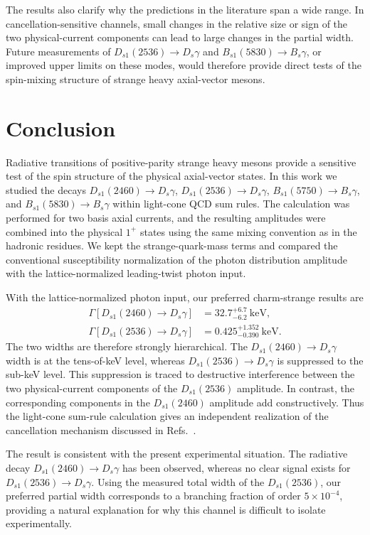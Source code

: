 \documentclass[aps,prd,preprint,nofootinbib,superscriptaddress]{revtex4-2}
\newcommand{\Ds}{D_s}
\newcommand{\Dsone}{D_{s1}}
\newcommand{\Bs}{B_s}
\newcommand{\Bsone}{B_{s1}}
\newcommand{\keV}{\mathrm{keV}}
\begin{document}
The results also clarify why the predictions in the literature span a wide
range.  In cancellation-sensitive channels, small changes in the relative size
or sign of the two physical-current components can lead to large changes in
the partial width.  Future measurements of
$\Dsone(2536)\to\Ds\gamma$ and $\Bsone(5830)\to\Bs\gamma$, or improved upper
limits on these modes, would therefore provide direct tests of the spin-mixing
structure of strange heavy axial-vector mesons.


\section{Conclusion}
\label{sec:concl}

Radiative transitions of positive-parity strange heavy mesons provide a
sensitive test of the spin structure of the physical axial-vector states.  In
this work we studied the decays
$\Dsone(2460)\to\Ds\gamma$, $\Dsone(2536)\to\Ds\gamma$,
$\Bsone(5750)\to\Bs\gamma$, and $\Bsone(5830)\to\Bs\gamma$
within light-cone QCD sum rules.  The calculation was performed for two basis
axial currents, and the resulting amplitudes were combined into the physical
$1^+$ states using the same mixing convention as in the hadronic residues.  We
kept the strange-quark-mass terms and compared the conventional
susceptibility normalization of the photon distribution amplitude with the
lattice-normalized leading-twist photon input.

With the lattice-normalized photon input, our preferred charm-strange results
are
\begin{align}
  \Gamma[\Dsone(2460)\to\Ds\gamma]
  &=
  32.7^{+6.7}_{-6.2}~\keV,
  \\
  \Gamma[\Dsone(2536)\to\Ds\gamma]
  &=
  0.425^{+1.352}_{-0.390}~\keV .
\end{align}
The two widths are therefore strongly hierarchical.  The
$\Dsone(2460)\to\Ds\gamma$ width is at the tens-of-keV level, whereas
$\Dsone(2536)\to\Ds\gamma$ is suppressed to the sub-keV level.  This
suppression is traced to destructive interference between the two
physical-current components of the $\Dsone(2536)$ amplitude.  In contrast, the
corresponding components in the $\Dsone(2460)$ amplitude add constructively.
Thus the light-cone sum-rule calculation gives an independent realization of
the cancellation mechanism discussed in Refs.~\cite{Bondar:2023mua,
Bondar:2025smw}.

The result is consistent with the present experimental situation.  The
radiative decay $\Dsone(2460)\to\Ds\gamma$ has been observed, whereas no clear
signal exists for $\Dsone(2536)\to\Ds\gamma$.  Using the measured total width
of the $\Dsone(2536)$, our preferred partial width corresponds to a branching
fraction of order $5\times10^{-4}$, providing a natural explanation for why
this channel is difficult to isolate experimentally.
\end{document}
